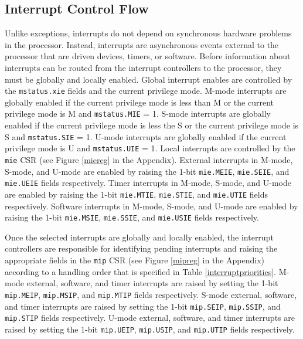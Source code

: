 \documentclass[12pt]{article}
\begin{document}
\subsection{Interrupt Control Flow}
Unlike exceptions, interrupts do not depend on synchronous hardware problems in the processor. Instead, interrupts are asynchronous events external to the processor that are driven devices, timers, or software. Before information about interrupts can be routed from the interrupt controllers to the processor, they must be globally and locally enabled. Global interrupt enables are controlled by the {\tt{mstatus.xie}} fields and the current privilege mode. M-mode interrupts are globally enabled if the current privilege mode is less than M or the current privilege mode is M and {\tt{mstatus.MIE}} = 1. S-mode interrupts are globally enabled if the current privilege mode is less the S or the current privilege mode is S and {\tt{mstatus.SIE}} = 1. U-mode interrupts are globally enabled if the current privilege mode is U and {\tt{mstatus.UIE}} = 1. Local interrupts are controlled by the {\tt{mie}} CSR (see Figure \ref{miereg} in the Appendix). External interrupts in M-mode, S-mode, and U-mode are enabled by raising the 1-bit {\tt{mie.MEIE}}, {\tt{mie.SEIE}}, and {\tt{mie.UEIE}} fields respectively. Timer interrupts in M-mode, S-mode, and U-mode are enabled by raising the 1-bit {\tt{mie.MTIE}}, {\tt{mie.STIE}}, and {\tt{mie.UTIE}} fields respectively. Software interrupts in M-mode, S-mode, and U-mode are enabled by raising the 1-bit {\tt{mie.MSIE}}, {\tt{mie.SSIE}}, and {\tt{mie.USIE}} fields respectively. 

Once the selected interrupts are globally and locally enabled, the interrupt controllers are responsible for identifying pending interrupts and raising the appropriate fields in the {\tt{mip}} CSR (see Figure \ref{mipreg} in the Appendix) according to a handling order that is specified in Table \ref{interruptpriorities}. M-mode external, software, and timer interrupts are raised by setting the 1-bit {\tt{mip.MEIP}}, {\tt{mip.MSIP}}, and {\tt{mip.MTIP}} fields respectively. S-mode external, software, and timer interrupts are raised by setting the 1-bit {\tt{mip.SEIP}}, {\tt{mip.SSIP}}, and {\tt{mip.STIP}} fields respectively. U-mode external, software, and timer interrupts are raised by setting the 1-bit {\tt{mip.UEIP}}, {\tt{mip.USIP}}, and {\tt{mip.UTIP}} fields respectively. 
\end{document}
